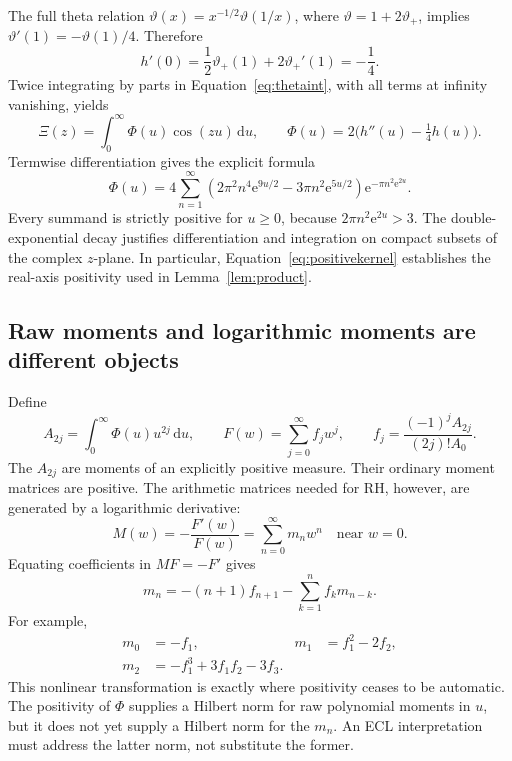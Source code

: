 \documentclass[11pt,letterpaper]{article}
\numberwithin{equation}{section}
\theoremstyle{definition}
\theoremstyle{remark}
\newcommand{\dd}{\,\mathrm d}
\newcommand{\e}{\mathrm e}
\begin{document}
The full theta relation $\vartheta(x)=x^{-1/2}\vartheta(1/x)$, where $\vartheta=1+2\vartheta_+$, implies $\vartheta'(1)=-\vartheta(1)/4$. Therefore
\begin{equation}
 h'(0)=\frac12\vartheta_+(1)+2\vartheta_+'(1)=-\frac14.
\end{equation}
Twice integrating by parts in Equation~\eqref{eq:thetaint}, with all terms at infinity vanishing, yields
\begin{equation}
 \Xi(z)=\int_0^\infty\Phi(u)\cos(zu)\dd u,
 \qquad \Phi(u)=2\bigl(h''(u)-\tfrac14h(u)\bigr).
 \label{eq:positivekernel}
\end{equation}
Termwise differentiation gives the explicit formula
\begin{equation}
 \Phi(u)=4\sum_{n=1}^{\infty}
 \left(2\pi^2n^4\e^{9u/2}-3\pi n^2\e^{5u/2}\right)
 \e^{-\pi n^2\e^{2u}}.
 \label{eq:phiseries}
\end{equation}
Every summand is strictly positive for $u\geq0$, because $2\pi n^2\e^{2u}>3$. The double-exponential decay justifies differentiation and integration on compact subsets of the complex $z$-plane. In particular, Equation~\eqref{eq:positivekernel} establishes the real-axis positivity used in Lemma~\ref{lem:product}.

\subsection{Raw moments and logarithmic moments are different objects}
Define
\begin{equation}
 A_{2j}=\int_0^\infty\Phi(u)u^{2j}\dd u,
 \qquad F(w)=\sum_{j=0}^{\infty}f_jw^j,
 \qquad f_j=\frac{(-1)^jA_{2j}}{(2j)!A_0}.
 \label{eq:rawmoments}
\end{equation}
The $A_{2j}$ are moments of an explicitly positive measure. Their ordinary moment matrices are positive. The arithmetic matrices needed for RH, however, are generated by a logarithmic derivative:
\begin{equation}
 M(w)=-\frac{F'(w)}{F(w)}=\sum_{n=0}^{\infty}m_nw^n
 \quad\text{near }w=0.
 \label{eq:logmoments}
\end{equation}
Equating coefficients in $MF=-F'$ gives
\begin{equation}
 m_n=-(n+1)f_{n+1}-\sum_{k=1}^{n}f_km_{n-k}.
 \label{eq:recurrence}
\end{equation}
For example,
\begin{align}
 m_0&=-f_1, &m_1&=f_1^2-2f_2,\\
 m_2&=-f_1^3+3f_1f_2-3f_3.
 \label{eq:firstmoments}
\end{align}
This nonlinear transformation is exactly where positivity ceases to be automatic. The positivity of $\Phi$ supplies a Hilbert norm for raw polynomial moments in $u$, but it does not yet supply a Hilbert norm for the $m_n$. An ECL interpretation must address the latter norm, not substitute the former.
\end{document}

